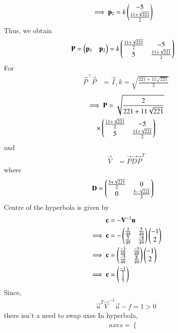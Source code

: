 \begin{enumerate}
\begin{align}
\\
\implies \mathbf{p}_2 &= k \begin{pmatrix} -5 \\ \frac{11+\sqrt{221}}{2}\end{pmatrix}
\label{eq:solutions/40/7/eq:es71/eqei2}
\end{align}
Thus, we obtain 
\begin{align}
\mathbf{P} &= \begin{pmatrix}\mathbf{p}_1 & \mathbf{p}_2\end{pmatrix}
= k \begin{pmatrix} \frac{11+\sqrt{221}}{2} & -5  \\ 5 & \frac{11+\sqrt{221}}{2}\end{pmatrix}
\end{align}
%
For
\begin{align}
\vec{P}^{\top}\vec{P} &= \vec{I},
k = \sqrt{\frac{221+11\sqrt{221}}{2}}
\end{align}
\begin{multline}
\implies \mathbf{P} = \sqrt{\frac{2}{221+11\sqrt{221}}}
\\
\times \begin{pmatrix} \frac{11+\sqrt{221}}{2} & -5  \\ 5 & \frac{11+\sqrt{221}}{2}\end{pmatrix}
\label{eq:solutions/40/7/eq:es71/eqP}
\end{multline}
and
\begin{align}
    \vec{V}&=\vec{P}\vec{D}\vec{P}^T\label{eq:solutions/40/7/eq:es71/eqsubs}
\end{align}
where 
\begin{align}
       \mathbf{D}&=\begin{pmatrix}\frac{5+\sqrt{221}}{2} & 0\\0 & \frac{5-\sqrt{221}}{2}\end{pmatrix}\label{eq:solutions/40/7/eq:es71/eqDD}
\end{align}
Centre of the hyperbola is given by 
\begin{align}
    \mathbf{c}&=-\mathbf{V}^{-1}\mathbf{u}\\
    \implies\mathbf{c}&=-\begin{pmatrix}\frac{3}{49}&\frac{5}{49}\\\frac{5}{49}&\frac{-8}{49}\end{pmatrix}\begin{pmatrix}-1 \\ 2\end{pmatrix}\\
    \implies\mathbf{c}&=\begin{pmatrix}\frac{-3}{49}&\frac{-5}{49}\\\frac{-5}{49}&\frac{8}{49}\end{pmatrix}\begin{pmatrix}-1 \\ 2\end{pmatrix}\\
    \implies\mathbf{c}&=\begin{pmatrix}\frac{-1}{7}\\\frac{3}{7}\end{pmatrix}
\end{align}
Since,
\begin{align}
    \vec{u}^T\vec{V}^{-1}\vec{u}-f = 1 > 0\label{eq:solutions/40/7/eq:es71/cond}
\end{align} 
there isn't a need to swap axes
In hyperbola,
\begin{align}
axes=
\begin{cases}

\end{cases}
\end{align}
\end{enumerate}
